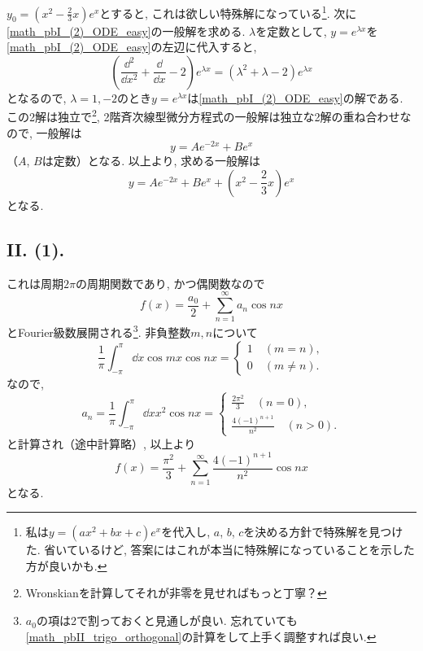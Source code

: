 $y_0=(x^2-\frac{2}{3}x)e^x$とすると, これは欲しい特殊解になっている\footnote{私は$y=(ax^2+bx+c)e^{x}$を代入し, $a$, $b$, $c$を決める方針で特殊解を見つけた. 省いているけど, 答案にはこれが本当に特殊解になっていることを示した方が良いかも. }. 
次に\eqref{math_pbI_(2)_ODE_easy}の一般解を求める. 
$\lambda$を定数として, $y=e^{\lambda x}$を\eqref{math_pbI_(2)_ODE_easy}の左辺に代入すると, 
\begin{equation}
  \left(\frac{\dd^2}{\dd x^2}+\frac{\dd}{\dd x}-2\right)e^{\lambda x}=(\lambda^2+\lambda-2)e^{\lambda x}
\end{equation}
となるので, $\lambda=1, -2$のとき$y=e^{\lambda x}$は\eqref{math_pbI_(2)_ODE_easy}の解である. 
この2解は独立で\footnote{Wronskianを計算してそれが非零を見せればもっと丁寧？}, 2階斉次線型微分方程式の一般解は独立な2解の重ね合わせなので, 一般解は
\begin{equation}
  y=Ae^{-2x}+Be^{x}
\end{equation}
（$A$, $B$は定数）となる. 
以上より, 求める一般解は
\begin{equation}
  y=Ae^{-2x}+Be^{x}+\left(x^2-\frac{2}{3}x\right)e^x
\end{equation}
となる. 

\subsection*{II. (1).}
これは周期$2\pi$の周期関数であり, かつ偶関数なので
\begin{equation}
  f(x)=\frac{a_0}{2}+\sum_{n=1}^{\infty}a_n\cos{nx}
\end{equation}
とFourier級数展開される\footnote{$a_0$の項は2で割っておくと見通しが良い. 忘れていても\eqref{math_pbII_trigo_orthogonal}の計算をして上手く調整すれば良い. }. 
非負整数$m, n$について
\begin{equation}
  \frac{1}{\pi}\int_{-\pi}^{\pi}\dd{x}\cos{mx}\cos{nx}=
  \begin{cases}
    1\quad (m=n), \\
    0\quad (m\neq n). 
  \end{cases}\label{math_pbII_trigo_orthogonal}
\end{equation}
なので, 
\begin{equation}
  a_n=\frac{1}{\pi}\int_{-\pi}^{\pi}\dd{x}x^2\cos{nx}=  \begin{cases}
    \frac{2\pi^2}{3}\quad (n=0), \\
    \frac{4(-1)^{n+1}}{n^2}\quad (n>0). 
  \end{cases}
\end{equation}
と計算され（途中計算略）, 以上より
\begin{equation}
  f(x)=\frac{\pi^2}{3}+\sum_{n=1}^{\infty}\frac{4(-1)^{n+1}}{n^2}\cos{nx}
\end{equation}
となる. 

